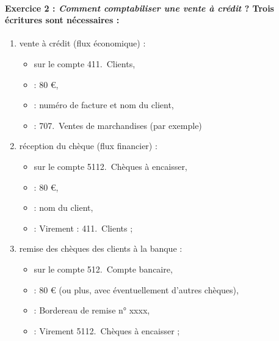 	
\paragraph{Exercice 2 :\label{association-answer-2} \emph{Comment comptabiliser une vente à crédit} ? Trois écritures sont nécessaires :}

\begin{enumerate}
	\item vente à crédit (flux économique) :
		\begin{itemize}
			\item sur le compte 411.~Clients,
			\item {} : 80 €,					
			\item {} : numéro de facture et nom du client,
			\item {} : 707.~Ventes de marchandises (par exemple)
		\end{itemize}				
	\item réception du chèque (flux financier) :
		\begin{itemize}
			\item sur le compte 5112.~Chèques à encaisser,
			\item {} : 80 €,					
			\item {} : nom du client,
			\item {} : Virement : 411.~Clients ;
		\end{itemize}
	\item remise des chèques des clients à la banque :
		\begin{itemize}
			\item sur le compte 512.~Compte bancaire,
			\item {} : 80 € (ou plus, avec éventuellement d’autres chèques),				
			\item {} : Bordereau de remise n° xxxx,
			\item {} : Virement 5112.~Chèques à encaisser ;
		\end{itemize}
\end{enumerate}



	
	
	
	
	

